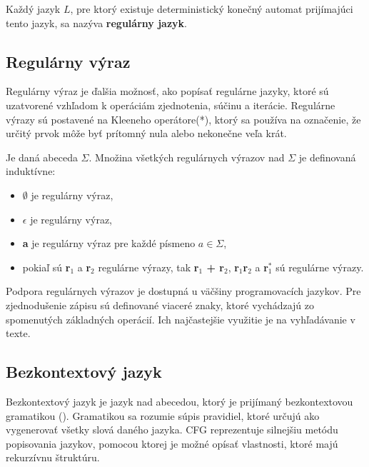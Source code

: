 Každý jazyk $L$, pre ktorý existuje deterministický konečný automat prijímajúci tento jazyk, sa nazýva \textbf{regulárny jazyk}.

\subsection{Regulárny výraz}\label{regexp}
Regulárny výraz je ďalšia možnosť, ako popísať regulárne jazyky, ktoré sú uzatvorené vzhľadom k operáciám zjednotenia, súčinu a iterácie. Regulárne výrazy sú postavené na Kleeneho operátore(*), ktorý sa používa na označenie, že určitý prvok môže byť prítomný nula alebo nekonečne veľa krát.
\begin{definice}
Je daná abeceda $\Sigma$. Množina všetkých regulárnych výrazov nad $\Sigma$ je definovaná induktívne:
\begin{itemize}
\item $\emptyset$ je regulárny výraz,
\item $\epsilon$ je regulárny výraz,
\item \textbf{a} je regulárny výraz pre každé písmeno $a \in \Sigma$,
\item pokiaľ sú \textbf{r$_1$} a \textbf{r$_2$} regulárne výrazy, tak \textbf{r$_1$ + r$_2$}, \textbf{r$_1$r$_2$} a \textbf{r$_1^*$} sú regulárne výrazy. \cite{demlova:automaty}
\end{itemize}
\end{definice}

Podpora regulárnych výrazov je dostupná u väčšiny programovacích jazykov. Pre zjednodušenie zápisu sú definované viaceré znaky, ktoré vychádzajú zo spomenutých základných operácií. Ich najčastejšie využitie je na vyhľadávanie v texte.


\subsection{Bezkontextový jazyk}\label{CFG}
Bezkontextový jazyk je jazyk nad abecedou, ktorý je prijímaný bezkontextovou gramatikou (). Gramatikou sa rozumie súpis pravidiel, ktoré určujú ako vygenerovať všetky slová daného jazyka. CFG reprezentuje silnejšiu metódu popisovania jazykov, pomocou ktorej je možné opísať vlastnosti, ktoré majú rekurzívnu štruktúru.

